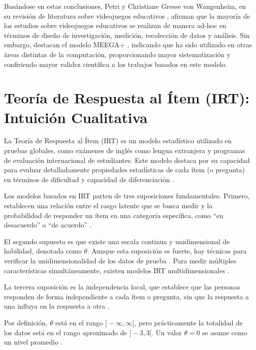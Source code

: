 Basándose en estas conclusiones, Petri y Christiane Gresse von Wangenheim, en su revisión de literatura sobre videojuegos educativos \cite{HowGamesComputingEducationEvaluated}, afirman que la mayoría de los estudios sobre videojuegos educativos se realizan de manera ad-hoc en términos de diseño de investigación, medición, recolección de datos y análisis. Sin embargo, destacan el modelo MEEGA+ \cite{meegaplusQualityEvaluationPage}, indicando que ha sido utilizado en otras áreas distintas de la computación, proporcionando mayor sistematización y confiriendo mayor validez científica a los trabajos basados en este modelo.

\section{Teoría de Respuesta al Ítem (IRT): Intuición Cualitativa}

La Teoría de Respuesta al Ítem (IRT) es un modelo estadístico utilizado en pruebas globales, como exámenes de inglés como lengua extranjera y programas de evaluación internacional de estudiantes. Este modelo destaca por su capacidad para evaluar detalladamente propiedades estadísticas de cada ítem (o pregunta) en términos de dificultad y capacidad de diferenciación \cite{Linden2015HandbookOI, IRTShojima2022}.

Los modelos basados en IRT parten de tres suposiciones fundamentales. Primero, establecen una relación entre el rasgo latente que se busca medir y la probabilidad de responder un ítem en una categoría específica, como ``en desacuerdo'' o ``de acuerdo'' \cite{CalderonStatisticalIRT}.

El segundo supuesto es que existe una escala continua y unidimensional de habilidad, denotada como $\theta$. Aunque esta suposición es fuerte, hay técnicas para verificar la unidimensionalidad de los datos de prueba \cite{IRTShojima2022}. Para medir múltiples características simultáneamente, existen modelos IRT multidimensionales \cite{Reckase2009MultidimensionalIRT}.

La tercera suposición es la independencia local, que establece que las personas responden de forma independiente a cada ítem o pregunta, sin que la respuesta a una influya en la respuesta a otra \cite{CalderonStatisticalIRT}.

Por definición, $\theta$ está en el rango $]-\infty, \infty [$, pero prácticamente la totalidad de los datos está en el rango aproximado de $]-3, 3[$. Un valor $\theta = 0$ se asume como un nivel promedio \cite{IRTShojima2022}. 

